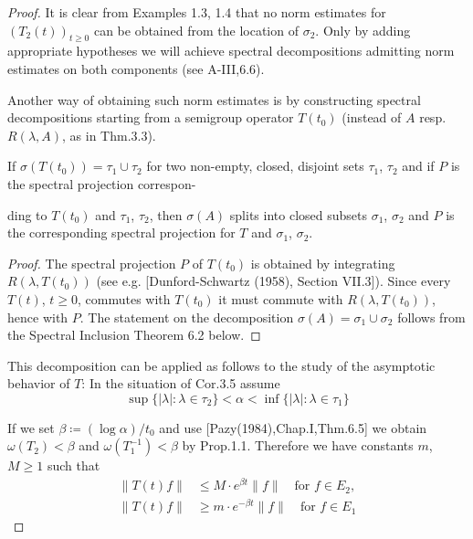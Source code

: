 \begin{proof}
It is clear from Examples 1.3, 1.4 that no norm estimates for $(T_{2}(t))_{t \geq 0}$ can be obtained from the location of $\sigma_{2}$.
Only by adding appropriate hypotheses we will achieve spectral decompositions admitting norm estimates on both components (see A-III,6.6).

Another way of obtaining such norm estimates is by constructing spectral decompositions starting from a semigroup operator $T(t_{0})$ (instead of $A$ resp. $R(\lambda,A)$, as in Thm.3.3).

\begin{corollary}\label{cor:a3-3.5}
	
	If $\sigma(T(t_{0})) = \tau_{1} \cup \tau_{2}$ for two non-empty, closed, disjoint sets $\tau_{1}$, $\tau_{2}$ and if $P$ is the spectral projection correspon-



\newpage
ding to $T(t_{0})$ and $\tau_{1}$, $\tau_{2}$, then $\sigma(A)$ splits into closed subsets $\sigma_{1}$, $\sigma_{2}$ and $P$ is the corresponding spectral projection for $T$ and $\sigma_{1}$, $\sigma_{2}$.
\end{corollary}

\begin{proof}
	The spectral projection $P$ of $T(t_{0})$ is obtained by integrating $R(\lambda,T(t_{0}))$ (see e.g. [Dunford-Schwartz (1958), Section VII.3]).
	Since every $T(t)$, $t \geq 0$, commutes with $T(t_{0})$ it must commute with $R(\lambda,T(t_{0}))$, hence with $P$.
	The statement on the decomposition $\sigma(A) = \sigma_{1} \cup \sigma_{2}$ follows from the Spectral Inclusion Theorem 6.2 below.
\end{proof}

This decomposition can be applied as follows to the study of the asymptotic behavior of $T$: In the situation of Cor.3.5 assume
\[
\sup \{|\lambda| \colon \lambda \in \tau_{2}\} < \alpha < \inf \{|\lambda| \colon \lambda \in \tau_{1}\}
\]

If we set $\beta \coloneqq (\log\alpha)/t_{0}$ and use [Pazy(1984),Chap.I,Thm.6.5] we obtain $\omega(T_{2}) < \beta$ and $\omega(T_{1}^{-1}) < \beta$ by Prop.1.1.
Therefore we have constants $m$, $M \geq 1$ such that
\begin{align*}
	\|T(t)f\| &\leq M \cdot e^{\beta t}\|f\| \quad \text{for } f \in E_{2}, \\
	\|T(t)f\| &\geq m \cdot e^{-\beta t}\|f\| \quad \text{for } f \in E_{1}
\end{align*}


\end{proof}
